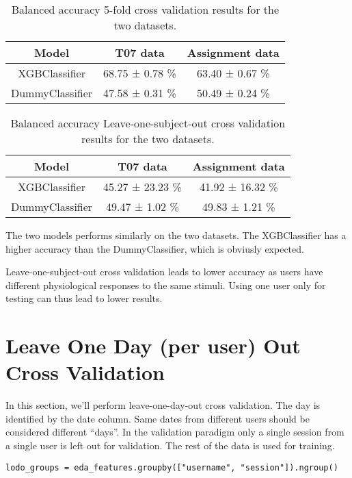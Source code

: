 \documentclass{usireport}
\begin{document}
\begin{table}[H]
    \centering
    \begin{tabular}{|c|c|c|}
        \hline
        \textbf{Model} & \textbf{T07 data} & \textbf{Assignment data} \\
        \hline
        XGBClassifier & 68.75 ± 0.78 \% & 63.40 ± 0.67 \% \\
        DummyClassifier & 47.58 ± 0.31 \% & 50.49 ± 0.24 \% \\
        \hline
    \end{tabular}
    \caption{Balanced accuracy 5-fold cross validation results for the two datasets.}
    \label{tab:5-fold-cross-validation}
\end{table}

\begin{table}[H]
    \centering
    \begin{tabular}{|c|c|c|}
        \hline
        \textbf{Model} & \textbf{T07 data} & \textbf{Assignment data} \\
        \hline
        XGBClassifier & 45.27 ± 23.23 \% & 41.92 ± 16.32 \% \\
        DummyClassifier & 49.47 ± 1.02 \% & 49.83 ± 1.21 \% \\
        \hline
    \end{tabular}
    \caption{Balanced accuracy Leave-one-subject-out cross validation results for the two datasets.}
    \label{tab:LOSO-cross-validation}
\end{table}


The two models performs similarly on the two datasets. The XGBClassifier has a higher accuracy than the DummyClassifier, which is obviusly expected.

Leave-one-subject-out cross validation leads to lower accuracy as users have different physiological responses to the same stimuli. Using one user only for testing can thus lead to lower results.


\section{Leave One Day (per user) Out Cross Validation}
In this section, we'll perform leave-one-day-out cross validation. The day is
identified by the date column. Same dates from different users should be
considered different “days”. In the validation paradigm only a single session from a single user is left out for validation. The rest of the data is used for training. 

\begin{verbatim}
lodo_groups = eda_features.groupby(["username", "session"]).ngroup()
\end{verbatim}
\end{document}
